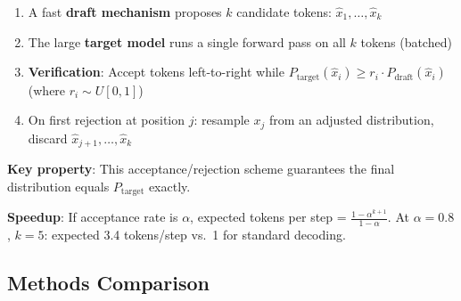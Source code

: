 \begin{keybox}
\begin{enumerate}
  \item A fast \textbf{draft mechanism} proposes $k$ candidate tokens: $\hat{x}_1, \ldots, \hat{x}_k$
  \item The large \textbf{target model} runs a single forward pass on all $k$ tokens (batched)
  \item \textbf{Verification}: Accept tokens left-to-right while $P_{\text{target}}(\hat{x}_i) \geq r_i \cdot P_{\text{draft}}(\hat{x}_i)$ (where $r_i \sim U[0,1]$)
  \item On first rejection at position $j$: resample $x_j$ from an adjusted distribution, discard $\hat{x}_{j+1}, \ldots, \hat{x}_k$
\end{enumerate}

\textbf{Key property}: This acceptance/rejection scheme guarantees the final distribution equals $P_{\text{target}}$ exactly.

\textbf{Speedup}: If acceptance rate is $\alpha$, expected tokens per step = $\frac{1 - \alpha^{k+1}}{1 - \alpha}$. At $\alpha=0.8$, $k=5$: expected 3.4 tokens/step vs.~1 for standard decoding.
\end{keybox}

\subsection{Methods Comparison}
\label{methods-comparison}

